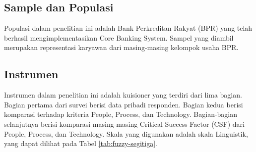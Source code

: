 \documentclass[journal,article,submit,pdftex,moreauthors]{Definitions/mdpi}
\begin{document}

\subsection{Sample dan Populasi}
Populasi dalam penelitian ini adalah Bank Perkreditan Rakyat (BPR) yang telah berhasil mengimplementasikan Core Banking System. Sampel yang diambil merupakan representasi karyawan dari masing-masing kelompok usaha BPR.

\subsection{Instrumen}
Instrumen dalam penelitian ini adalah kuisioner yang terdiri dari lima bagian. Bagian pertama dari survei berisi data pribadi responden. Bagian kedua berisi komparasi terhadap kriteria People, Process, dan Technology. Bagian-bagian selanjutnya berisi komparasi masing-masing Critical Success Factor (CSF) dari People, Process, dan Technology. Skala yang digunakan adalah skala Linguistik, yang dapat dilihat pada Tabel \ref{tab:fuzzy-segitiga}.
\end{document}
